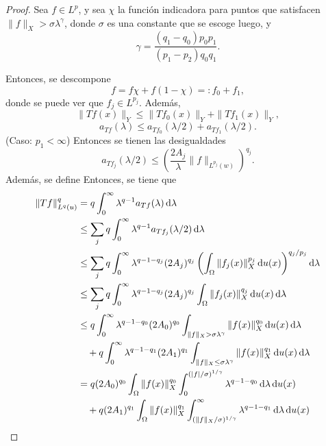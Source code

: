 \begin{proof}
	Sea $f\in L^p$, y sea $\chi$ la función indicadora para puntos que satisfacen $\|f\|_X>\sigma\lambda^\gamma$, donde $\sigma$ es una constante que se escoge luego, y \begin{equation*}
		\gamma = \frac{(q_1-q_0)p_0p_1}{(p_1-p_2)q_0q_1}.
	\end{equation*}
	
	Entonces, se descompone
	\begin{equation*}
		f = f\chi + f(1-\chi) =: f_0 + f_1,
	\end{equation*}
	donde se puede ver que $f_j \in L^{p_j}$. Además, 
	\begin{equation*}
		\|Tf(x)\|_Y  \leq \|Tf_0(x)\|_Y +\|Tf_1(x)\|_Y, 
	\end{equation*}
	\begin{equation*}
		a_{Tf}(\lambda) \leq a_{Tf_0}(\lambda/2) + a_{Tf_1}(\lambda/2).
	\end{equation*}
	(Caso: $p_1<\infty$)  Entonces se tienen las desigualdades 
	\begin{equation*}
		a_{Tf_j}(\lambda/2) \leq \left(\frac{2A_j}{\lambda}\|f\|_{L^{p_j}(w)}\right)^{q_j}.
	\end{equation*}
	Además, se define 
	Entonces, se tiene que 
	\begin{align*}
		\|Tf\|_{L^q(u)}^q & = q\int_0^\infty\lambda^{q-1}a_{Tf}(\lambda) \diff \lambda \\
		& \leq \sum_j q\int_0^\infty\lambda^{q-1}a_{Tf_j}(\lambda/2) \diff \lambda \\
		& \leq \sum_j q\int_0^\infty\lambda^{q-1-q_j} (2A_j)^{q_j}\left( \int_\Omega \|f_j(x)\|_X^{p_j}\diff u(x) \right)^{q_j/p_j}\diff \lambda\\ 
		& \leq \sum_j q\int_0^\infty\lambda^{q-1-q_j} (2A_j)^{q_j}\int_\Omega \|f_j(x)\|_X^{q_j}\diff u(x) \diff \lambda\\
		& \leq q\int_0^\infty\lambda^{q-1-q_0} (2A_0)^{q_0}\int_{\|f\|_X>\sigma\lambda^\gamma} \|f(x)\|_X^{q_0}\diff u(x) \diff \lambda\\
		& \quad + q\int_0^\infty\lambda^{q-1-q_1} (2A_1)^{q_1} \int_{\|f\|_X\leq\sigma\lambda^\gamma} \|f(x)\|_X^{q_1}\diff u(x) \diff \lambda\\
		& = q(2A_0)^{q_0} \int_\Omega \|f(x)\|_X^{q_0} \int_0^{(|f|/\sigma)^{1/\gamma}} \lambda^{q-1-q_0} \diff\lambda \diff u(x) \\
		& \quad + q(2A_1)^{q_1} \int_\Omega \|f(x)\|_X^{q_1} \int_{(\|f\|_X/\sigma)^{1/\gamma}}^{\infty} \lambda^{q-1-q_1} \diff\lambda \diff u(x) \\

\end{align*}
\end{proof}
